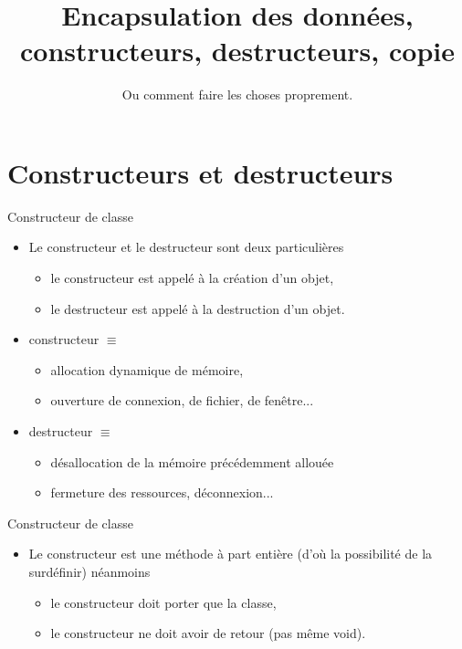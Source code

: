 \documentclass[c]{beamer}
\title{Encapsulation des données, constructeurs, destructeurs, copie}
\subtitle{Ou comment faire les choses proprement.}
\begin{document}
\maketitle

\section{Constructeurs et destructeurs}


\begin{frame}[fragile]{Constructeur de classe}
\begin{itemize}
\item Le constructeur et le destructeur sont deux  particulières

\begin{itemize}
\item le constructeur est appelé à la création d'un objet,
\item le destructeur est appelé à la destruction d'un objet.
\end{itemize}

\item constructeur \(\equiv\) 
\begin{itemize}
\item allocation dynamique de mémoire,
\item ouverture de connexion, de fichier, de fenêtre...
\end{itemize}

\item destructeur \(\equiv\) 
\begin{itemize}
\item désallocation de la mémoire précédemment allouée
\item fermeture des ressources, déconnexion...
\end{itemize}

\end{itemize}
\end{frame}

\begin{frame}[fragile]{Constructeur de classe}
\begin{itemize}
\item Le constructeur est une méthode à part entière (d'où la possibilité de la
  surdéfinir) néanmoins
  
\begin{itemize}
\item le constructeur doit porter  que la classe,

\item le constructeur ne doit avoir  de retour (pas même void).
\end{itemize}
\end{itemize}
\end{frame}
\end{document}
